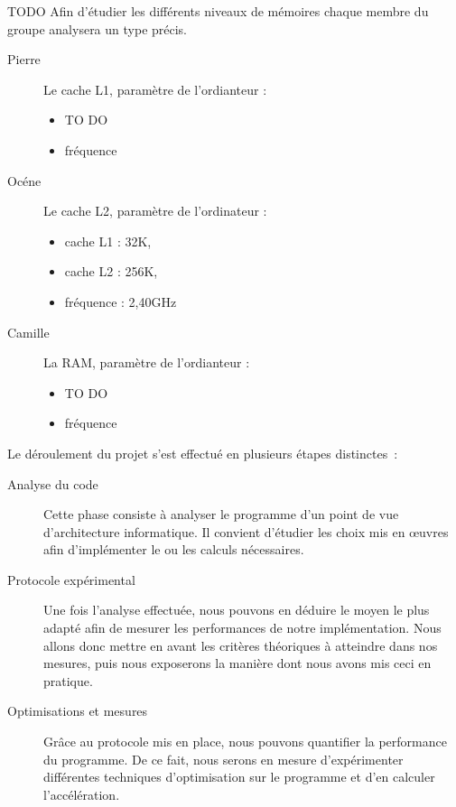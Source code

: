 \documentclass[12pt,a4paper]{article}
\begin{document}
TODO
Afin d'étudier les différents niveaux de mémoires chaque membre du groupe 
analysera un type précis.

\begin{description}
    \item[Pierre] Le cache L1, paramètre de l'ordianteur : 
		\begin{itemize}
				\item TO DO
				\item fréquence
		\end{itemize}
    \item[Océne ] Le cache L2, paramètre de l'ordinateur : 
		\begin{itemize}
			\item cache L1 : 32K,
			\item cache L2 : 256K,
			\item fréquence : 2,40GHz
		\end{itemize}
    \item[Camille] La RAM, paramètre de l'ordianteur : 
        \begin{itemize}
			\item TO DO
			\item fréquence
		\end{itemize}
\end{description} 

Le déroulement du projet s'est effectué en plusieurs étapes distinctes :
\begin{description}
    \item[Analyse du code] Cette phase consiste à analyser le programme d'un
        point de vue d'architecture informatique. Il convient d'étudier les
        choix mis en œuvres afin d'implémenter le ou les calculs nécessaires.
    \item[Protocole expérimental] Une fois l'analyse effectuée, nous
        pouvons en déduire le moyen le plus adapté afin de mesurer les
        performances de notre implémentation. Nous allons donc mettre en
        avant les critères théoriques à atteindre dans nos mesures, puis
        nous exposerons la manière dont nous avons mis ceci en pratique.
    \item[Optimisations et mesures] Grâce au protocole mis en place, nous
        pouvons quantifier la performance du programme. De ce fait, nous serons
        en mesure d'expérimenter différentes techniques d'optimisation sur le
        programme et d'en calculer l'accélération.
\end{description}
\end{document}
